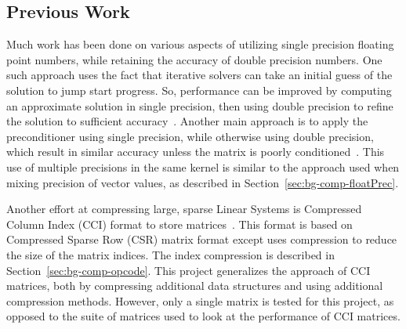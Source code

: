 \subsection{Previous Work}
Much work has been done on various aspects of utilizing single precision floating point numbers, while retaining the accuracy of double precision numbers.
One such approach uses the fact that iterative solvers can take an initial guess of the solution to jump start progress.
So, performance can be improved by computing an approximate solution in single precision, then using double precision to refine the solution to sufficient accuracy~\cite{Babolin:2008:coursePass, Buttari:2007:coursePass}.
Another main approach is to apply the preconditioner using single precision, while otherwise using double precision, which result in similar accuracy unless the matrix is poorly conditioned~\cite{Buttari:2008:mixedPrec, Hogg:2010:multiplePasses}.
This use of multiple precisions in the same kernel is similar to the approach used when mixing precision of vector values, as described in Section~\ref{sec:bg-comp-floatPrec}.

Another effort at compressing large, sparse Linear Systems is Compressed Column Index (CCI) format to store matrices~\cite{Lawlor:2013:compression}.
This format is based on Compressed Sparse Row (CSR) matrix format except uses compression to reduce the size of the matrix indices.
The index compression is described in Section~\ref{sec:bg-comp-opcode}.
This project generalizes the approach of CCI matrices, both by compressing additional data structures and using additional compression methods.
However, only a single matrix is tested for this project, as opposed to the suite of matrices used to look at the performance of CCI matrices.